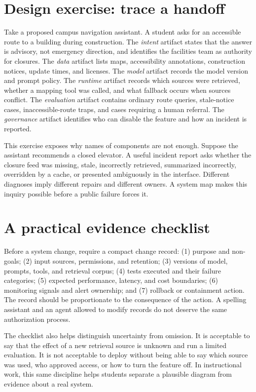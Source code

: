 \documentclass[11pt]{article}
\begin{document}
\section{Design exercise: trace a handoff}
Take a proposed campus navigation assistant. A student asks for an accessible route to a building during construction. The \emph{intent} artifact states that the answer is advisory, not emergency direction, and identifies the facilities team as authority for closures. The \emph{data} artifact lists maps, accessibility annotations, construction notices, update times, and licenses. The \emph{model} artifact records the model version and prompt policy. The \emph{runtime} artifact records which sources were retrieved, whether a mapping tool was called, and what fallback occurs when sources conflict. The \emph{evaluation} artifact contains ordinary route queries, stale-notice cases, inaccessible-route traps, and cases requiring a human referral. The \emph{governance} artifact identifies who can disable the feature and how an incident is reported.

This exercise exposes why names of components are not enough. Suppose the assistant recommends a closed elevator. A useful incident report asks whether the closure feed was missing, stale, incorrectly retrieved, summarized incorrectly, overridden by a cache, or presented ambiguously in the interface. Different diagnoses imply different repairs and different owners. A system map makes this inquiry possible before a public failure forces it.

\section{A practical evidence checklist}
Before a system change, require a compact change record: (1) purpose and non-goals; (2) input sources, permissions, and retention; (3) versions of model, prompts, tools, and retrieval corpus; (4) tests executed and their failure categories; (5) expected performance, latency, and cost boundaries; (6) monitoring signals and alert ownership; and (7) rollback or containment action. The record should be proportionate to the consequence of the action. A spelling assistant and an agent allowed to modify records do not deserve the same authorization process.

The checklist also helps distinguish uncertainty from omission. It is acceptable to say that the effect of a new retrieval source is unknown and run a limited evaluation. It is not acceptable to deploy without being able to say which source was used, who approved access, or how to turn the feature off. In instructional work, this same discipline helps students separate a plausible diagram from evidence about a real system.
\end{document}
